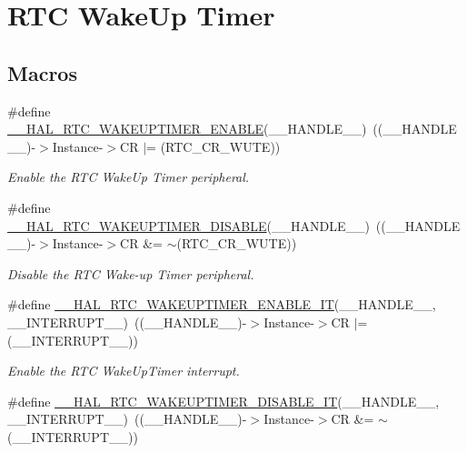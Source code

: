 \hypertarget{group___r_t_c_ex___wake_up___timer}{}\section{R\+TC Wake\+Up Timer}
\label{group___r_t_c_ex___wake_up___timer}
\subsection*{Macros}
\begin{DoxyCompactItemize}
\item 
\#define \hyperlink{group___r_t_c_ex___wake_up___timer_ga9b3ce87851ab95b1ab508b524a1055c8}{\+\_\+\+\_\+\+H\+A\+L\+\_\+\+R\+T\+C\+\_\+\+W\+A\+K\+E\+U\+P\+T\+I\+M\+E\+R\+\_\+\+E\+N\+A\+B\+LE}(\+\_\+\+\_\+\+H\+A\+N\+D\+L\+E\+\_\+\+\_\+)~((\+\_\+\+\_\+\+H\+A\+N\+D\+L\+E\+\_\+\+\_\+)-\/$>$Instance-\/$>$CR $\vert$= (R\+T\+C\+\_\+\+C\+R\+\_\+\+W\+U\+TE))
\begin{DoxyCompactList}\small\item\em Enable the R\+TC Wake\+Up Timer peripheral. \end{DoxyCompactList}\item 
\#define \hyperlink{group___r_t_c_ex___wake_up___timer_ga18822c018d0b07be72ca315220bb02df}{\+\_\+\+\_\+\+H\+A\+L\+\_\+\+R\+T\+C\+\_\+\+W\+A\+K\+E\+U\+P\+T\+I\+M\+E\+R\+\_\+\+D\+I\+S\+A\+B\+LE}(\+\_\+\+\_\+\+H\+A\+N\+D\+L\+E\+\_\+\+\_\+)~((\+\_\+\+\_\+\+H\+A\+N\+D\+L\+E\+\_\+\+\_\+)-\/$>$Instance-\/$>$CR \&= $\sim$(R\+T\+C\+\_\+\+C\+R\+\_\+\+W\+U\+TE))
\begin{DoxyCompactList}\small\item\em Disable the R\+TC Wake-\/up Timer peripheral. \end{DoxyCompactList}\item 
\#define \hyperlink{group___r_t_c_ex___wake_up___timer_gab02dbd4cbdcd1c544a5e45b37fad276b}{\+\_\+\+\_\+\+H\+A\+L\+\_\+\+R\+T\+C\+\_\+\+W\+A\+K\+E\+U\+P\+T\+I\+M\+E\+R\+\_\+\+E\+N\+A\+B\+L\+E\+\_\+\+IT}(\+\_\+\+\_\+\+H\+A\+N\+D\+L\+E\+\_\+\+\_\+,  \+\_\+\+\_\+\+I\+N\+T\+E\+R\+R\+U\+P\+T\+\_\+\+\_\+)~((\+\_\+\+\_\+\+H\+A\+N\+D\+L\+E\+\_\+\+\_\+)-\/$>$Instance-\/$>$CR $\vert$= (\+\_\+\+\_\+\+I\+N\+T\+E\+R\+R\+U\+P\+T\+\_\+\+\_\+))
\begin{DoxyCompactList}\small\item\em Enable the R\+TC Wake\+Up\+Timer interrupt. \end{DoxyCompactList}\item 
\#define \hyperlink{group___r_t_c_ex___wake_up___timer_ga702b63d21958eab45856264c19ee6004}{\+\_\+\+\_\+\+H\+A\+L\+\_\+\+R\+T\+C\+\_\+\+W\+A\+K\+E\+U\+P\+T\+I\+M\+E\+R\+\_\+\+D\+I\+S\+A\+B\+L\+E\+\_\+\+IT}(\+\_\+\+\_\+\+H\+A\+N\+D\+L\+E\+\_\+\+\_\+,  \+\_\+\+\_\+\+I\+N\+T\+E\+R\+R\+U\+P\+T\+\_\+\+\_\+)~((\+\_\+\+\_\+\+H\+A\+N\+D\+L\+E\+\_\+\+\_\+)-\/$>$Instance-\/$>$CR \&= $\sim$(\+\_\+\+\_\+\+I\+N\+T\+E\+R\+R\+U\+P\+T\+\_\+\+\_\+))

\end{DoxyCompactItemize}
